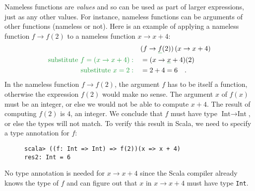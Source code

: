Nameless functions are \emph{values} and so can be used as part of
larger expressions, just as any other values. For instance, nameless
functions can be arguments of other functions (nameless or not). Here
is an example of applying a nameless function $f\rightarrow f(2)$
to a nameless function $x\rightarrow x+4$:
\begin{align*}
 & (f\rightarrow\gunderline f(2))\left(x\rightarrow x+4\right)\\
{\color{greenunder}\text{substitute }f=\left(x\rightarrow x+4\right):}\quad & =(x\rightarrow\gunderline x+4)(2)\\
{\color{greenunder}\text{substitute }x=2:}\quad & =2+4=6\quad.
\end{align*}
In the nameless function $f\rightarrow f(2)$, the argument $f$ has
to be itself a function, otherwise the expression $f(2)$ would make
no sense. The argument $x$ of $f(x)$ must be an integer, or else
we would not be able to compute $x+4$. The result of computing $f(2)$
is $4$, an integer. We conclude that $f$ must have type $\text{Int}\rightarrow\text{Int}$,
or else the types will not match. To verify this result in Scala,
we need to specify a type annotation for $f$:

\begin{wrapfigure}{l}{0.46\columnwidth}%
\vspace{-0.75\baselineskip}
\begin{lstlisting}
scala> ((f: Int => Int) => f(2))(x => x + 4)
res2: Int = 6  
\end{lstlisting}
\vspace{-0.75\baselineskip}
\end{wrapfigure}%

\noindent No type annotation is needed for $x\rightarrow x+4$ since
the Scala compiler already knows the type of $f$ and can figure out
that $x$ in $x\rightarrow x+4$ must have type \lstinline!Int!.

